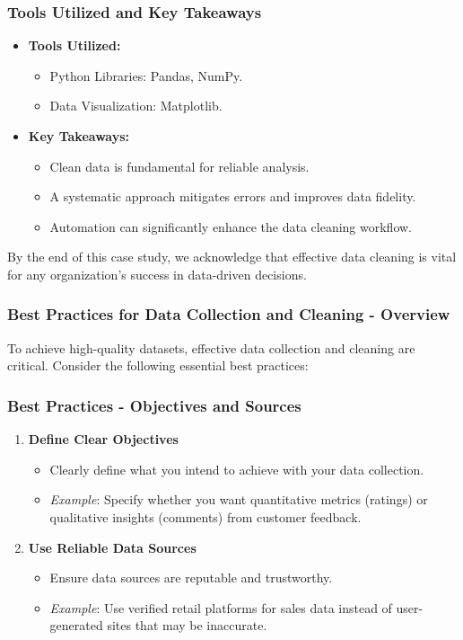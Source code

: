 \documentclass[aspectratio=169]{beamer}
\begin{document}
\begin{frame}[fragile]
    \frametitle{Tools Utilized and Key Takeaways}
    
    \begin{itemize}
        \item \textbf{Tools Utilized:}
        \begin{itemize}
            \item Python Libraries: Pandas, NumPy.
            \item Data Visualization: Matplotlib.
        \end{itemize}
        
        \item \textbf{Key Takeaways:}
        \begin{itemize}
            \item Clean data is fundamental for reliable analysis.
            \item A systematic approach mitigates errors and improves data fidelity.
            \item Automation can significantly enhance the data cleaning workflow.
        \end{itemize}
    \end{itemize}
    
    By the end of this case study, we acknowledge that effective data cleaning is vital for any organization's success in data-driven decisions.
\end{frame}

\begin{frame}[fragile]
    \frametitle{Best Practices for Data Collection and Cleaning - Overview}
    To achieve high-quality datasets, effective data collection and cleaning are critical. Consider the following essential best practices:
\end{frame}

\begin{frame}[fragile]
    \frametitle{Best Practices - Objectives and Sources}
    \begin{enumerate}
        \item \textbf{Define Clear Objectives}
        \begin{itemize}
            \item Clearly define what you intend to achieve with your data collection.
            \item \textit{Example}: Specify whether you want quantitative metrics (ratings) or qualitative insights (comments) from customer feedback.
        \end{itemize}

        \item \textbf{Use Reliable Data Sources}
        \begin{itemize}
            \item Ensure data sources are reputable and trustworthy.
            \item \textit{Example}: Use verified retail platforms for sales data instead of user-generated sites that may be inaccurate.
        \end{itemize}
    \end{enumerate}
\end{frame}
\end{document}
